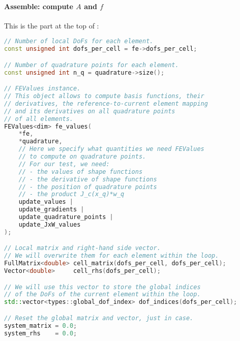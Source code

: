 \paragraph[Assemble: compute \texorpdfstring{$A$}{A} and \texorpdfstring{$f$}{f}]{Assemble: compute $A$ and $f$}

This is the part at the top of :
\begin{lstlisting}[language=C++]
// Number of local DoFs for each element.
const unsigned int dofs_per_cell = fe->dofs_per_cell;

// Number of quadrature points for each element.
const unsigned int n_q = quadrature->size();

// FEValues instance.
// This object allows to compute basis functions, their
// derivatives, the reference-to-current element mapping
// and its derivatives on all quadrature points
// of all elements.
FEValues<dim> fe_values(
    *fe,
    *quadrature,
    // Here we specify what quantities we need FEValues
    // to compute on quadrature points.
    // For our test, we need:
    // - the values of shape functions
    // - the derivative of shape functions
    // - the position of quadrature points
    // - the product J_c(x_q)*w_q
    update_values |
    update_gradients |
    update_quadrature_points |
    update_JxW_values
);

// Local matrix and right-hand side vector.
// We will overwrite them for each element within the loop.
FullMatrix<double> cell_matrix(dofs_per_cell, dofs_per_cell);
Vector<double>     cell_rhs(dofs_per_cell);

// We will use this vector to store the global indices
// of the DoFs of the current element within the loop.
std::vector<types::global_dof_index> dof_indices(dofs_per_cell);

// Reset the global matrix and vector, just in case.
system_matrix = 0.0;
system_rhs    = 0.0;\end{lstlisting}

